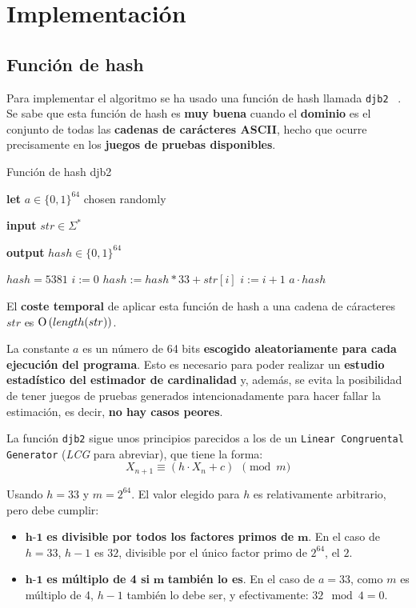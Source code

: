 % 
\section{Implementación}

\subsection{Función de hash}
\label{implementacion:hash}

Para implementar el algoritmo se ha usado una función de hash llamada \texttt{djb2} ~\cite{hash:djb2}.
Se sabe que esta función de hash
es \textbf{muy buena} cuando el \textbf{dominio} es el conjunto de todas las \textbf{cadenas de carácteres ASCII},
hecho que ocurre precisamente en los \textbf{juegos de pruebas disponibles}.

\begin{algorithm}[h]
\caption{Función de hash djb2}
\textbf{let} $a \in \{0, 1\}^{64}$ chosen randomly

\textbf{input} $str \in \Sigma^*$

\textbf{output} $hash \in \{0, 1\}^{64}$
\begin{algorithmic}
    \STATE $hash = 5381$
    \STATE $i := 0$
        \STATE $hash := hash * 33 + str[i]$
        \STATE $i := i + 1$
    \ENDWHILE
    \RETURN $a \cdot hash$
\end{algorithmic}
\end{algorithm}

El \textbf{coste temporal} de aplicar esta función de hash a una cadena de cáracteres $str$ es $\operatorname{O}\left(length(str)\right)$.

La constante $a$ es un número de 64 bits \textbf{escogido aleatoriamente para cada ejecución del programa}.
Esto es necesario para poder realizar un \textbf{estudio estadístico del estimador de cardinalidad} y, además, se evita la posibilidad
de tener juegos de pruebas generados intencionadamente para hacer fallar la estimación, es decir, \textbf{no hay casos peores}.

La función \texttt{djb2} sigue unos principios parecidos a los de un \texttt{Linear Congruental Generator}  (\emph{LCG} para abreviar),
que tiene la forma:
$$X_{n+1} \equiv \left( h \cdot X_n + c \right)~~\pmod{m}$$

Usando $h=33$ y $m=2^{64}$. El valor elegido para $h$ es relativamente arbitrario, pero debe cumplir:

\begin{itemize}
	\item $\textbf{h-1}$ \textbf{es divisible por todos los factores primos de} $\textbf{m}$.
En el caso de $h=33$, $h-1$ es $32$, divisible por el único factor primo de $2^{64}$, el $2$.

	\item $\textbf{h-1}$ \textbf{es múltiplo de 4 si} $\textbf{m}$ \textbf{también lo es}.
En el caso de $a=33$, como $m$ es múltiplo de 4, $h-1$ también lo debe ser, y efectivamente: $32 \! \mod 4 = 0$.
\end{itemize}

